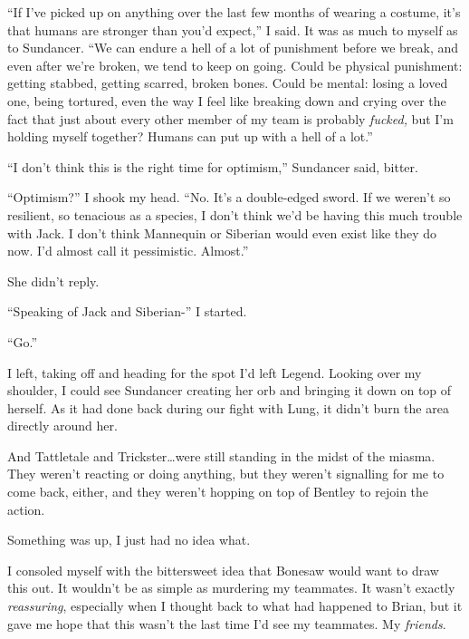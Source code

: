 ``If I've picked up on anything over the last few months of wearing a costume, it's that humans are stronger than you'd expect,'' I said.  It was as much to myself as to Sundancer.  ``We can endure a hell of a lot of punishment before we break, and even after we're broken, we tend to keep on going.  Could be physical punishment: getting stabbed, getting scarred, broken bones.  Could be mental: losing a loved one, being tortured, even the way I feel like breaking down and crying over the fact that just about every other member of my team is probably \emph{fucked, }but I'm holding myself together?  Humans can put up with a hell of a lot.''



``I don't think this is the right time for optimism,'' Sundancer said, bitter.



``Optimism?''  I shook my head.  ``No.  It's a double-edged sword.  If we weren't so resilient, so tenacious as a species, I don't think we'd be having this much trouble with Jack.  I don't think Mannequin or Siberian would even exist like they do now.  I'd almost call it pessimistic.  Almost.''



She didn't reply.



``Speaking of Jack and Siberian-'' I started.



``Go.''



I left, taking off and heading for the spot I'd left Legend.  Looking over my shoulder, I could see Sundancer creating her orb and bringing it down on top of herself.  As it had done back during our fight with Lung, it didn't burn the area directly around her.



And Tattletale and Trickster\ldots were still standing in the midst of the miasma.  They weren't reacting or doing anything, but they weren't signalling for me to come back, either, and they weren't hopping on top of Bentley to rejoin the action.



Something was up, I just had no idea what.



I consoled myself with the bittersweet idea that Bonesaw would want to draw this out.  It wouldn't be as simple as murdering my teammates.  It wasn't exactly \emph{reassuring}, especially when I thought back to what had happened to Brian, but it gave me hope that this wasn't the last time I'd see my teammates.  My \emph{friends}.




